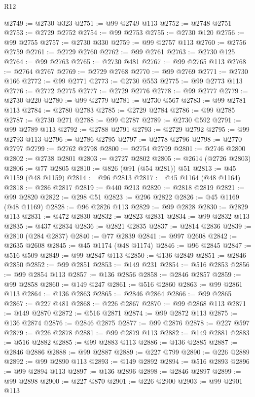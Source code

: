 \begin{lexlean}{R12}
\begin{coremodule}
{{{{{{{{{{{{{{{{{{{{{{{{{{{{{{{{{{{{{{{{{{{{{{{{{{{{{{{{{{{{{{{{{{{{{{{{{{{{{{{{{{{{{{{{{{{{{{{{{{{{{{{{{{@2749 := @2730 @323
@2751 := @99 @2749 @113
@2752 := @2748 @2751
@2753 := @2729 @2752
@2754 := @99 @2753
@2755 := @2730 @120
@2756 := @99 @2755
@2757 := @2730 @330
@2759 := @99 @2757 @113
@2760 := @2756 @2759
@2761 := @2729 @2760
@2762 := @99 @2761
@2763 := @2730 @125
@2764 := @99 @2763
@2765 := @2730 @481
@2767 := @99 @2765 @113
@2768 := @2764 @2767
@2769 := @2729 @2768
@2770 := @99 @2769
@2771 := @2730 @166
@2772 := @99 @2771
@2773 := @2730 @553
@2775 := @99 @2773 @113
@2776 := @2772 @2775
@2777 := @2729 @2776
@2778 := @99 @2777
@2779 := @2730 @220
@2780 := @99 @2779
@2781 := @2730 @567
@2783 := @99 @2781 @113
@2784 := @2780 @2783
@2785 := @2729 @2784
@2786 := @99 @2785
@2787 := @2730 @271
@2788 := @99 @2787
@2789 := @2730 @592
@2791 := @99 @2789 @113
@2792 := @2788 @2791
@2793 := @2729 @2792
@2795 := @99 @2793 @113
@2796 := @2786 @2795
@2797 := @2778 @2796
@2798 := @2770 @2797
@2799 := @2762 @2798
@2800 := @2754 @2799
@2801 := @2746 @2800
@2802 := @2738 @2801
@2803 := @2727 @2802
@2805 := @2614 (@2726 @2803)
@2806 := @77 @2805
@2810 := @826 (@91 (@54 @281)) @51
@2813 := @45 @1159 (@48 @1159)
@2814 := @96 @2813
@2817 := @45 @1164 (@48 @1164)
@2818 := @286 @2817
@2819 := @440 @213
@2820 := @2818 @2819
@2821 := @99 @2820
@2822 := @298 @51
@2823 := @296 @2822
@2826 := @45 @1169 (@48 @1169)
@2828 := @96 @2826 @113
@2829 := @99 @2828
@2830 := @2829 @113
@2831 := @472 @2830
@2832 := @2823 @2831
@2834 := @99 @2832 @113
@2835 := @437 @2834
@2836 := @2821 @2835
@2837 := @2814 @2836
@2839 := @2810 (@284 @2837)
@2840 := @77 @2839
@2841 := @997 @2608
@2842 := @2635 @2608
@2845 := @45 @1174 (@48 @1174)
@2846 := @96 @2845
@2847 := @516 @509
@2849 := @99 @2847 @113
@2850 := @136 @2849
@2851 := @2846 @2850
@2852 := @99 @2851
@2853 := @149 @231
@2854 := @516 @2853
@2856 := @99 @2854 @113
@2857 := @136 @2856
@2858 := @2846 @2857
@2859 := @99 @2858
@2860 := @149 @247
@2861 := @516 @2860
@2863 := @99 @2861 @113
@2864 := @136 @2863
@2865 := @2846 @2864
@2866 := @99 @2865
@2867 := @227 @481
@2868 := @226 @2867
@2870 := @99 @2868 @113
@2871 := @149 @2870
@2872 := @516 @2871
@2874 := @99 @2872 @113
@2875 := @136 @2874
@2876 := @2846 @2875
@2877 := @99 @2876
@2878 := @227 @597
@2879 := @226 @2878
@2881 := @99 @2879 @113
@2882 := @149 @2881
@2883 := @516 @2882
@2885 := @99 @2883 @113
@2886 := @136 @2885
@2887 := @2846 @2886
@2888 := @99 @2887
@2889 := @227 @799
@2890 := @226 @2889
@2892 := @99 @2890 @113
@2893 := @149 @2892
@2894 := @516 @2893
@2896 := @99 @2894 @113
@2897 := @136 @2896
@2898 := @2846 @2897
@2899 := @99 @2898
@2900 := @227 @870
@2901 := @226 @2900
@2903 := @99 @2901 @113
}}}}}}}}}}}}}}}}}}}}}}}}}}}}}}}}}}}}}}}}}}}}}}}}}}}}}}}}}}}}}}}}}}}}}}}}}}}}}}}}}}}}}}}}}}}}}}}}}}}}}}}}}}
\end{coremodule}
\end{lexlean}
